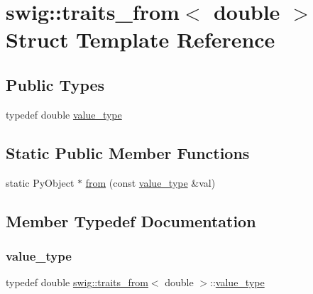 \hypertarget{structswig_1_1traits__from_3_01double_01_4}{}\section{swig\+:\+:traits\+\_\+from$<$ double $>$ Struct Template Reference}
\label{structswig_1_1traits__from_3_01double_01_4}
\subsection*{Public Types}
\begin{DoxyCompactItemize}
\item 
typedef double \hyperlink{structswig_1_1traits__from_3_01double_01_4_a91858e8bb1587ef10fc2c5e277abcc33}{value\+\_\+type}
\end{DoxyCompactItemize}
\subsection*{Static Public Member Functions}
\begin{DoxyCompactItemize}
\item 
static Py\+Object $\ast$ \hyperlink{structswig_1_1traits__from_3_01double_01_4_ae561b4392eb983662f203737585c2241}{from} (const \hyperlink{structswig_1_1traits__from_3_01double_01_4_a91858e8bb1587ef10fc2c5e277abcc33}{value\+\_\+type} \&val)
\end{DoxyCompactItemize}


\subsection{Member Typedef Documentation}
\mbox{\label{structswig_1_1traits__from_3_01double_01_4_a91858e8bb1587ef10fc2c5e277abcc33}} 
\subsubsection{\texorpdfstring{value\+\_\+type}{value\_type}}
{\footnotesize\ttfamily typedef double \hyperlink{structswig_1_1traits__from}{swig\+::traits\+\_\+from}$<$ double $>$\+::\hyperlink{structswig_1_1traits__from_3_01double_01_4_a91858e8bb1587ef10fc2c5e277abcc33}{value\+\_\+type}}




